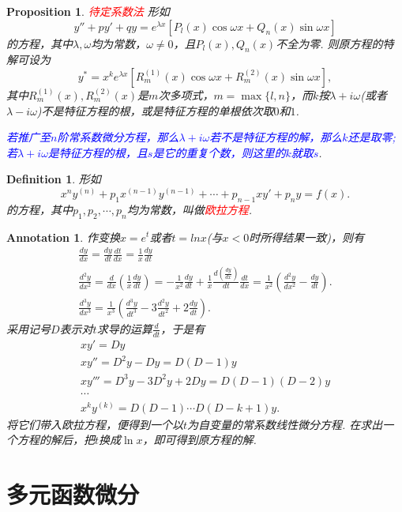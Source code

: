 \documentclass{article}
\newtheorem{proposition}[theorem]{Proposition}
\newtheorem{definition}[theorem]{Definition}
\newtheorem{annotation}[theorem]{Annotation}
\newcommand{\redt}[1]{\textcolor{red}{#1}}
\newcommand{\bluet}[1]{\textcolor{blue}{#1}}
\begin{document}
\begin{proposition}
\rm \redt{待定系数法} 形如
$$
y''+py' +qy = e^{\lambda x}[P_l(x)\cos \omega x + Q_n(x)\sin \omega x]
$$
的方程，其中$\lambda,\omega$均为常数，$\omega \neq 0$，且$P_l(x),Q_n(x)$不全为零. 则原方程的特解可设为
$$
y^* = x^ke^{\lambda x}[R_m^{(1)}(x)\cos\omega x + R_m^{(2)}(x)\sin\omega x],
$$
其中$R_m^{(1)}(x),R_m^{(2)}(x)$是$m$次多项式，$m=\max\{l,n\}$，而$k$按$\lambda + i\omega$(或者$\lambda-i\omega$)不是特征方程的根，或是特征方程的单根依次取$0$和$1$. 

\bluet{若推广至$n$阶常系数微分方程，那么$\lambda+i\omega$若不是特征方程的解，那么$k$还是取零; 若$\lambda+i\omega$是特征方程的根，且$s$是它的重复个数，则这里的$k$就取$s$}. 
\end{proposition}

\begin{definition}
\rm 形如
$$
x^ny^{(n)} + p_1x^{(n-1)}y^{(n-1)} + \cdots + p_{n-1}xy' + p_ny =f(x).
$$
的方程，其中$p_1,p_2,\cdots,p_n$均为常数，叫做\redt{欧拉方程}. 
\end{definition}

\begin{annotation}
\rm 作变换$x=e^t$或者$t = ln x$(与$x < 0$时所得结果一致)，则有
$$
\begin{array}{ll}
\frac{dy}{dx} = \frac{dy}{dt}\frac{dt}{dx} = \frac{1}{x} \frac{dy}{dt} \\
\frac{d^2y}{dx^2} = \frac{d}{dx}\left(\frac{1}{x}\frac{dy}{dt}\right) =  -\frac{1}{x^2} \frac{dy}{dt} + \frac{1}{x}\frac{d(\frac{dy}{dx})}{dt} \frac{dt}{dx} = \frac{1}{x^2}(\frac{d^2y}{dx^2}-\frac{dy}{dt}). \\
\frac{d^3y}{dx^3} = \frac{1}{x^3}(\frac{d^3y}{dt^3} - 3 \frac{d^2y}{dt^2} + 2\frac{dy}{dt}).
\end{array}
$$
采用记号$D$表示对$t$求导的运算$\frac{d}{dt}$，于是有
$$
\begin{array}{ll}
xy' = Dy \\
xy'' = D^2y - Dy = D(D-1)y \\
xy''' = D^3y - 3D^2y + 2Dy  = D(D-1)(D-2)y \\
\cdots \\
x^ky^{(k)} = D(D-1)\cdots D(D-k+1)y.
\end{array}
$$
将它们带入欧拉方程，便得到一个以$t$为自变量的常系数线性微分方程. 在求出一个方程的解后，把$t$换成$\ln x$，即可得到原方程的解. 
\end{annotation}


\newpage
\section{多元函数微分}
\end{document}
